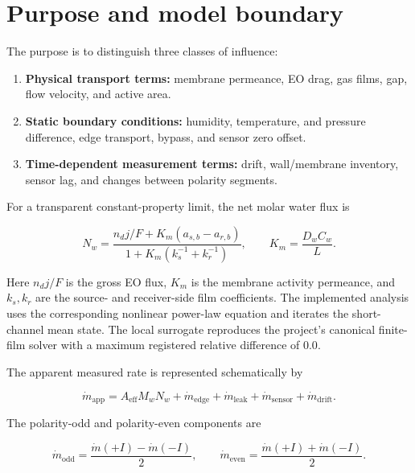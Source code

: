 \documentclass[10pt,a4paper]{article}
\begin{document}
\clearpage
\tableofcontents
\clearpage

\section{Purpose and model boundary}

The purpose is to distinguish three classes of influence:

\begin{enumerate}
  \item \textbf{Physical transport terms:} membrane permeance, EO drag, gas
  films, gap, flow velocity, and active area.
  \item \textbf{Static boundary conditions:} humidity, temperature, and
  pressure difference, edge transport, bypass, and sensor zero offset.
  \item \textbf{Time-dependent measurement terms:} drift, wall/membrane
  inventory, sensor lag, and changes between polarity segments.
\end{enumerate}

For a transparent constant-property limit, the net molar water flux is

\begin{equation}
N_w =
\frac{n_d j/F + K_m(a_{s,b}-a_{r,b})}
{1+K_m\left(k_s^{-1}+k_r^{-1}\right)},
\qquad
K_m=\frac{D_w C_w}{L}.
\label{eq:flux}
\end{equation}

Here $n_dj/F$ is the gross EO flux, $K_m$ is the membrane activity permeance,
and $k_s,k_r$ are the source- and receiver-side film coefficients. The
implemented analysis uses the corresponding nonlinear power-law equation and
iterates the short-channel mean state. The local surrogate reproduces the
project's canonical finite-film solver with a maximum registered relative
difference of $0.0$.

The apparent measured rate is represented schematically by

\begin{equation}
\dot m_{\mathrm{app}} = A_{\mathrm{eff}}M_wN_w
+\dot m_{\mathrm{edge}}+\dot m_{\mathrm{leak}}
+\dot m_{\mathrm{sensor}}+\dot m_{\mathrm{drift}}.
\label{eq:measurement}
\end{equation}

The polarity-odd and polarity-even components are

\begin{equation}
\dot m_{\mathrm{odd}}=\frac{\dot m(+I)-\dot m(-I)}{2},
\qquad
\dot m_{\mathrm{even}}=\frac{\dot m(+I)+\dot m(-I)}{2}.
\label{eq:odd-even}
\end{equation}
\end{document}

